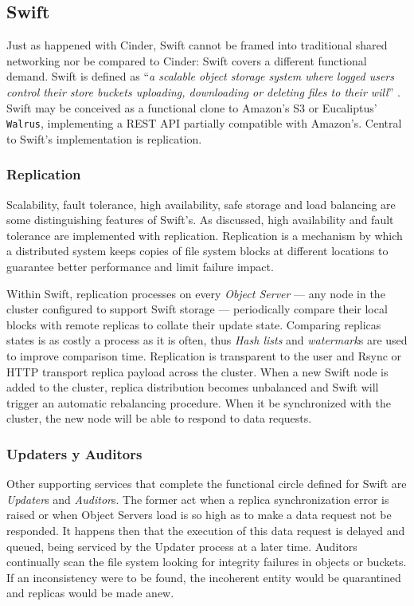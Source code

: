 \subsection{Swift}\label{subsec:swift}
\noindent Just as happened with Cinder, Swift cannot be framed into traditional shared networking nor  be compared to Cinder: Swift covers a different functional demand. Swift is defined as ``\emph{a scalable object storage system where logged users control their store buckets uploading, downloading or deleting files to their will}'' \cite{osswift}. Swift may be conceived as a functional clone to Amazon's S3 or Eucaliptus' \texttt{Walrus}, implementing a REST API partially compatible with Amazon's. Central to Swift's implementation is replication.

\subsubsection{Replication}\label{subsubsec:replicacion}
\noindent Scalability, fault tolerance, high availability, safe storage and load balancing are some distinguishing features of Swift's. As discussed, high availability and fault tolerance are implemented with replication. Replication is a mechanism by which a distributed system keeps copies of file system blocks at different locations to guarantee better performance and limit failure impact.

Within Swift, replication processes on every \emph{Object Server} --- any node in the cluster configured to support Swift storage --- periodically compare their local blocks with remote replicas to collate their update state. Comparing replicas states is as costly a process as it is often, thus \emph{Hash lists} and \emph{watermark}s are used to improve comparison time. Replication is transparent to the user and Rsync or HTTP transport replica payload across the cluster. When a new Swift node is added to the cluster, replica distribution becomes unbalanced and Swift will trigger an automatic rebalancing procedure. When it be synchronized with the cluster, the new node will be able to respond to data requests.

\subsubsection{Updaters y Auditors}\label{subsubsec:otroscompswift}
\noindent Other supporting services that complete the functional circle defined for Swift are \emph{Updater}s and \emph{Auditor}s. The former act when a replica synchronization error is raised or when Object Servers load is so high as to make a data request not be responded. It happens then that the execution of this data request is delayed and queued, being serviced by the Updater process at a later time. Auditors continually scan the file system looking for integrity failures in objects or buckets. If an inconsistency were to be found, the incoherent entity would be quarantined and replicas would be made anew.
